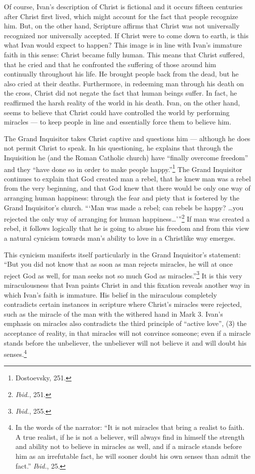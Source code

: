 Of course, Ivan's description of Christ is fictional and it occurs fifteen centuries after Christ first lived, which might account for the fact that people recognize him. But, on the other hand, Scripture affirms that Christ was not universally recognized nor universally accepted. If Christ were to come down to earth, is this what Ivan would expect to happen? This image is in line with Ivan's immature faith in this sense: Christ became fully human. This means that Christ suffered, that he cried and that he confronted the suffering of those around him continually throughout his life. He brought people back from the dead, but he also cried at their deaths. Furthermore, in redeeming man through his death on the cross, Christ did not negate the fact that human beings suffer. In fact, he reaffirmed the harsh reality of the world in his death. Ivan, on the other hand, seems to believe that Christ could have controlled the world by performing miracles --- to keep people in line and essentially force them to believe him.

The Grand Inquisitor takes Christ captive and questions him --- although he does not permit Christ to speak. In his questioning, he explains that through the Inquisition he (and the Roman Catholic church) have ``finally overcome freedom'' and they ``have done so in order to make people happy.''\footnote{Dostoevsky, 251.} The Grand Inquisitor continues to explain that God created man a rebel, that he knew man was a rebel from the very beginning, and that God knew that there would be only one way of arranging human happiness: through the fear and piety that is fostered by the Grand Inquisitor's church. ``\thinspace`Man was made a rebel; can rebels be happy? \ldots you rejected the only way of arranging for human happiness\ldots'\thinspace''\footnote{\emph{Ibid.}, 251.} If man was created a rebel, it follows logically that he is going to abuse his freedom and from this view a natural cynicism towards man's ability to love in a Christlike way emerges.

This cynicism manifests itself particularly in the Grand Inquisitor's statement: ``But you did not know that as soon as man rejects miracles, he will at once reject God as well, for man seeks not so much God as miracles.''\footnote{\emph{Ibid.}, 255.} It is this very miraculousness that Ivan paints Christ in and this fixation reveals another way in which Ivan's faith is immature. His belief in the miraculous completely contradicts certain instances in scripture where Christ's miracles were rejected, such as the miracle of the man with the withered hand in Mark 3. Ivan's emphasis on miracles also contradicts the third principle of ``active love'', (3) the acceptance of reality, in that miracles will not convince someone; even if a miracle stands before the unbeliever, the unbeliever will not believe it and will doubt his senses.\footnote{In the words of the narrator: ``It is not miracles that bring a realist to faith. A true realist, if he is not a believer, will always find in himself the strength and ability not to believe in miracles as well, and if a miracle stands before him as an irrefutable fact, he will sooner doubt his own senses than admit the fact.'' \emph{Ibid.}, 25.} 

